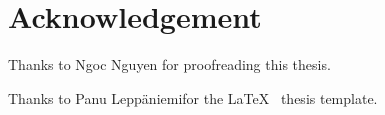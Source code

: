 
\pagestyle{empty}
\chapter*{Acknowledgement}

Thanks to Ngoc Nguyen for proofreading this thesis.

Thanks to Panu Leppäniemifor the \LaTeX{} ~thesis template.

\clearpage

